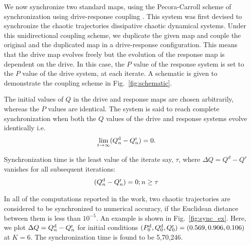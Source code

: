 \documentclass[reprint,amsmath,amssymb,aps,pre]{revtex4-1}
\begin{document}
We now synchronize two standard maps, using the Pecora-Carroll scheme of synchronization using drive-response coupling \cite{Pecora1990,Pecora2015}. 
This system was first devised to synchronize the chaotic trajectories dissipative chaotic dynamical systems. Under this unidirectional coupling scheme, we duplicate the given map and couple the original and the duplicated map in a drive-response configuration. This means that the drive map evolves freely but the evolution of the response map is dependent on the drive. In this case, the $P$ value of the response system is set to the $P$ value of the drive system, at each iterate.  A schematic is given to demonstrate the coupling scheme in Fig.~\ref{fig:schematic}.


The initial values of $Q$ in the drive and response maps are chosen 
arbitrarily, whereas the $P$ values are identical. The system is said to reach 
complete synchronization when both the $Q$ values of the drive and response 
systems evolve identically i.e. 
\begin{equation}
\lim_{t\rightarrow\infty}(Q^\textnormal{d}_n - Q^\textnormal{r}_n) = 0.
\end{equation}

Synchronization time is the least value of the iterate say, $\tau$, where $\Delta Q = Q^d-Q^r$ vanishes for all subsequent iterations: 
\begin{equation}
(Q^\textnormal{d}_n - Q^\textnormal{r}_n) = 0; \hfill  n \geq  \bf {\tau }
\end{equation}

In all of the computations reported in the work, two chaotic trajectories are considered to be synchronized to numerical accuracy, if the Euclidean distance between them is less than $10^{-5}$. An example is shown in 
Fig.~\ref{fig:sync_ex}. Here, we plot $\Delta Q = Q^\textnormal{d}_n-Q^\textnormal{r}_n$ for initial 
conditions $(P^\textnormal{d}_0,Q^\textnormal{d}_0,Q^\textnormal{r}_0) = 
(0.569, 0.906,0.106)$ at $K = 6$. The synchronization time is found to be 5,70,246. 
\end{document}
